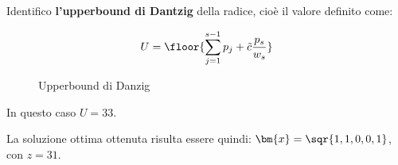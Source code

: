 \documentclass[\main/main.tex]{subfiles}
\begin{document}
Identifico \textbf{l'upperbound di Dantzig} della radice, cioè il valore definito come:

\begin{figure}
  \[
    U = \floor{\sum_{j=1}^{s-1} p_j + \tilde{c}\frac{p_s}{w_s}}
  \]
  \caption{Upperbound di Danzig}
\end{figure}

In questo caso $U=33$.

\begin{figure}
\end{figure}

La soluzione ottima ottenuta risulta essere quindi: $\bm{x}=\sqr{1,1,0,0,1}$, con $z=31$.
\end{document}

